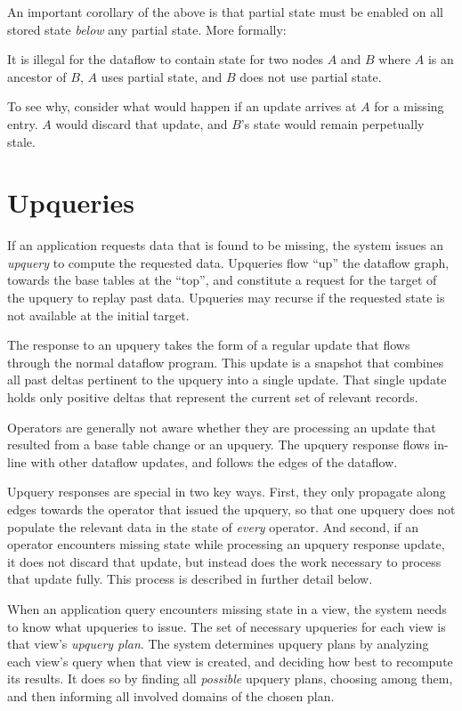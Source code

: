 An important corollary of the above is that partial state must be enabled
on all stored state \emph{below} any partial state. More formally:

\begin{invariant}
  \label{i:partial-above-full}
  It is illegal for the dataflow to contain state for two nodes $A$ and $B$
  where $A$ is an ancestor of $B$, $A$ uses partial state, and $B$ does not use
  partial state.
\end{invariant}

To see why, consider what would happen if an update arrives at $A$ for a missing
entry. $A$ would discard that update, and $B$'s state would remain perpetually
stale.

\section{Upqueries}

If an application requests data that is found to be missing, the system issues
an \textit{upquery} to compute the requested data. Upqueries flow ``up'' the
dataflow graph, towards the base tables at the ``top'', and constitute a request
for the target of the upquery to replay past data. Upqueries may recurse if the
requested state is not available at the initial target.

The response to an upquery takes the form of a regular update that flows through
the normal dataflow program. This update is a snapshot that combines all past
deltas pertinent to the upquery into a single update. That single update holds
only positive deltas that represent the current set of relevant records.

Operators are generally not aware whether they are processing an update that
resulted from a base table change or an upquery. The upquery response flows
in-line with other dataflow updates, and follows the edges of the dataflow.

Upquery responses are special in two key ways. First, they only propagate along
edges towards the operator that issued the upquery, so that one upquery does not
populate the relevant data in the state of \emph{every} operator. And second,
if an operator encounters missing state while processing an upquery response
update, it does not discard that update, but instead does the work necessary to
process that update fully. This process is described in further detail below.

When an application query encounters missing state in a view, the system needs
to know what upqueries to issue. The set of necessary upqueries for each view is
that view's \textit{upquery plan}. The system determines upquery plans by
analyzing each view's query when that view is created, and deciding how best
to recompute its results. It does so by finding all \emph{possible} upquery
plans, choosing among them, and then informing all involved domains of the
chosen plan.

